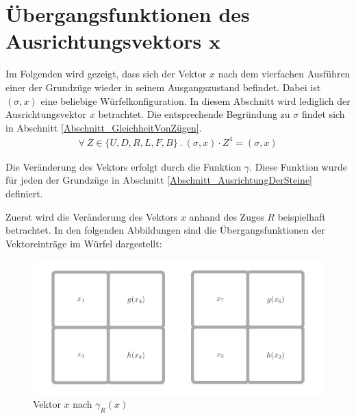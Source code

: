 \documentclass[12pt,a4paper, usenames, dvipsnames]{article}
\theoremstyle{mystyle}
\theoremstyle{definition}
\begin{document}
\newpage


\begin{spacing}{1.0}
\listoffigures
\end{spacing}

%
%
%
%
%
%
%
%
%
%
%
%
%
%
%
%
%
%

\newpage

\begin{spacing}{1.3}
\printbibliography
\end{spacing}


%
%
%
%
%
%
%
%
%
%
%
%
%
%
%
%
%
%
%
\newpage
\appendix



\section{Übergangsfunktionen des Ausrichtungsvektors $\pmb{x}$}

\label{Anhang_Ausrichtungsfunktionen}

Im Folgenden wird gezeigt, dass sich der Vektor $x$ nach dem vierfachen Ausführen einer der Grundzüge wieder in seinem Ausgangszustand befindet. Dabei ist $(\sigma, x)$ eine beliebige Würfelkonfiguration. In diesem Abschnitt wird lediglich der Ausrichtungsvektor $x$ betrachtet. Die entsprechende Begründung zu $\sigma$ findet sich in Abschnitt \ref{Abschnitt_GleichheitVonZügen}.
\begin{align*}
\forall \ Z \in \{U, D, R, L, F, B\} \ . \ (\sigma, x) \cdot Z^4 = (\sigma, x)
\end{align*}


Die Veränderung des Vektors erfolgt durch die Funktion $\gamma$. Diese Funktion wurde für jeden der Grundzüge in Abschnitt \ref{Abschnitt_AusrichtungDerSteine} definiert.

Zuerst wird die Veränderung des Vektors $x$ anhand des Zuges $R$ beispielhaft betrachtet. In den folgenden Abbildungen sind die Übergangsfunktionen der Vektoreinträge im Würfel dargestellt:

\begin{figure}[H]
\centering
\includegraphics[scale=0.155]{Rhoch1.jpg}
\caption{Vektor $x$ nach $\gamma_R(x)$}
\end{figure}
\end{document}
